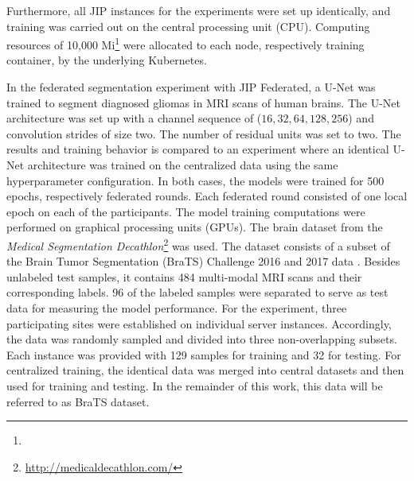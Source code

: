 Furthermore, all JIP instances for the experiments were set up identically, and training was carried out on the central processing unit (CPU). Computing resources of 10,000 Mi\footnote{} were allocated to each node, respectively training container, by the underlying Kubernetes.



In the federated segmentation experiment with JIP Federated, a U-Net \citep{Ronneberger2015U-net:Segmentation} was trained to segment diagnosed gliomas in MRI scans of human brains. The U-Net architecture was set up with a channel sequence of ($16, 32, 64, 128, 256$) and convolution strides of size two. The number of residual units was set to two.
The results and training behavior is compared to an experiment where an identical U-Net architecture was trained on the centralized data using the same hyperparameter configuration.
In both cases, the models were trained for 500 epochs, respectively federated rounds. Each federated round consisted of one local epoch on each of the participants.
The model training computations were performed on graphical processing units (GPUs).
The brain dataset from the \textit{Medical Segmentation Decathlon}\footnote{\url{http://medicaldecathlon.com/}} was used. The dataset consists of a subset of the Brain Tumor Segmentation (BraTS) \cite{Menze2015TheBRATS} Challenge 2016 and 2017 data \citep{Antonelli2021TheDecathlon}. Besides unlabeled test samples, it contains 484 multi-modal MRI scans and their corresponding labels. 96 of the labeled samples were separated to serve as test data for measuring the model performance. For the experiment, three participating sites were established on individual server instances. Accordingly, the data was randomly sampled and divided into three non-overlapping subsets. Each instance was provided with 129 samples for training and 32 for testing. For centralized training, the identical data was merged into central datasets and then used for training and testing.
In the remainder of this work, this data will be referred to as BraTS dataset.

